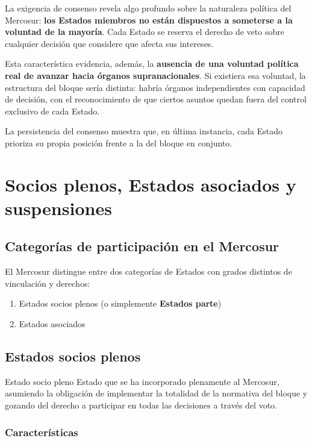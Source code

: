 \documentclass[12pt,oneside]{book}
\begin{document}
La exigencia de consenso revela algo profundo sobre la naturaleza política del Mercosur: \textbf{los Estados miembros no están dispuestos a someterse a la voluntad de la mayoría}. Cada Estado se reserva el derecho de veto sobre cualquier decisión que considere que afecta sus intereses.

Esta característica evidencia, además, la \textbf{ausencia de una voluntad política real de avanzar hacia órganos supranacionales}. Si existiera esa voluntad, la estructura del bloque sería distinta: habría órganos independientes con capacidad de decisión, con el reconocimiento de que ciertos asuntos quedan fuera del control exclusivo de cada Estado.

La persistencia del consenso muestra que, en última instancia, cada Estado prioriza su propia posición frente a la del bloque en conjunto.

\chapter{Socios plenos, Estados asociados y suspensiones}

\section{Categorías de participación en el Mercosur}

El Mercosur distingue entre dos categorías de Estados con grados distintos de vinculación y derechos:

\begin{enumerate}
\item Estados socios plenos (o simplemente \textbf{Estados parte})
\item Estados asociados
\end{enumerate}

\section{Estados socios plenos}

\begin{definition}{Estado socio pleno}
Estado que se ha incorporado plenamente al Mercosur, asumiendo la obligación de implementar la totalidad de la normativa del bloque y gozando del derecho a participar en todas las decisiones a través del voto.
\end{definition}

\subsection{Características}
\end{document}
